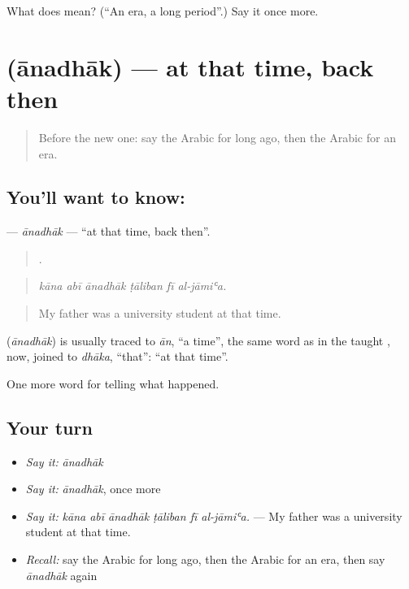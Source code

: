 \begin{tcolorbox}[breakable,colback=teal!4,colframe=teal!35!black,title={Before you move on}]
What does  mean? (\textquotedblleft{}An era, a long period\textquotedblright{}.) Say it once more.
\end{tcolorbox}
\section[\texorpdfstring{\ar{آنذاك} (ānadhāk)}{آنذاك (ānadhāk)}]{ (ānadhāk) — at that time, back then}

\label{lesson:AR-C304-anadhak}



\begin{quote}
Before the new one: say the Arabic for long ago, then the Arabic for an era.
\end{quote}

\subsection*{You'll want to know: }
\textbf{} — \emph{ānadhāk} — \textquotedblleft{}at that time, back then\textquotedblright{}.

\begin{quote}
     .
\end{quote}

\begin{quote}
\emph{kāna abī ānadhāk ṭāliban fī al-jāmiʿa.}
\end{quote}

\begin{quote}
My father was a university student at that time.
\end{quote}

\begin{cousinweb}
\textbf{} (\emph{ānadhāk}) is usually traced to \emph{ān}, \textquotedblleft{}a time\textquotedblright{}, the same word as in the taught , now, joined to \emph{dhāka}, \textquotedblleft{}that\textquotedblright{}: \textquotedblleft{}at that time\textquotedblright{}.
\end{cousinweb}

\begin{grammarlens}[title={What you've built}]
One more word for telling what happened.
\end{grammarlens}

\subsection*{Your turn}
\begin{itemize}
\raggedright
  \item \emph{Say it:} \emph{ānadhāk}
  \item \emph{Say it:} \emph{ānadhāk}, once more
  \item \emph{Say it:} \emph{kāna abī ānadhāk ṭāliban fī al-jāmiʿa.} — My father was a university student at that time.
  \item \emph{Recall:} say the Arabic for long ago, then the Arabic for an era, then say \emph{ānadhāk} again
\end{itemize}

